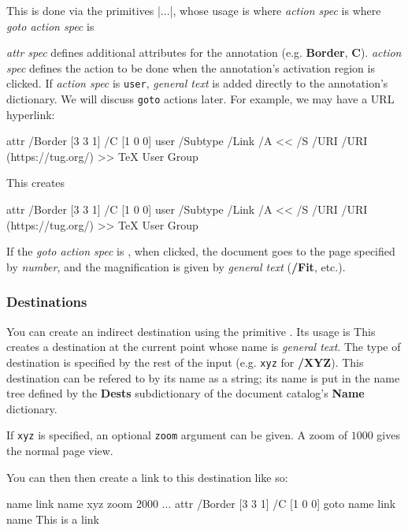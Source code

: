This is done via the primitives \inlinecode|\pdfstartlink...\pdfendlink|, whose usage is
\noindent where {\it action spec} is
\noindent where {\it goto action spec} is

{\it attr spec} defines additional attributes for the annotation (e.g. {\bf Border}, {\bf C}).
{\it action spec} defines the action to be done when the annotation's activation region is clicked.
If {\it action spec} is {\tt user}, {\it general text} is added directly to the annotation's dictionary.
We will discuss {\tt goto} actions later.
For example, we may have a URL hyperlink:

\blisting
\pdfstartlink
    attr {
        /Border [3 3 1]
        /C [1 0 0]
    }
    user {
        /Subtype /Link
        /A <<
            /S /URI
            /URI (https://tug.org/)
        >>
    }
\TeX{} User Group%
\pdfendlink
\elisting

This creates

\centerline{%
\pdfstartlink
    attr {
        /Border [3 3 1]
        /C [1 0 0]
    }
    user {
        /Subtype /Link
        /A <<
            /S /URI
            /URI (https://tug.org/)
        >>
    }
\TeX{} User Group%
\pdfendlink}

If the {\it goto action spec} is , when clicked, the document goes to the page
specified by {\it number}, and the magnification is given by {\it general text} ({\bf/Fit}, etc.).

\subsubsection{Destinations}

You can create an indirect destination using the primitive \macro\pdfdest.
Its usage is
\noindent This creates a destination at the current point whose name is {\it general text}.
The type of destination is specified by the rest of the input (e.g. {\tt xyz} for {\bf/XYZ}).
This destination can be refered to by its name as a string; its name is put in the name tree defined by
the {\bf Dests} subdictionary of the document catalog's {\bf Name} dictionary.

If {\tt xyz} is specified, an optional {\tt zoom} argument can be given.
A zoom of $1000$ gives the normal page view.

You can then then create a link to this destination like so:

\blisting
\pdfdest name {link name} xyz zoom 2000
...
\pdfstartlink
    attr {
        /Border [3 3 1]
        /C [1 0 0]
    }
    goto name {link name}%
This is a link%
\pdfendlink
\elisting

